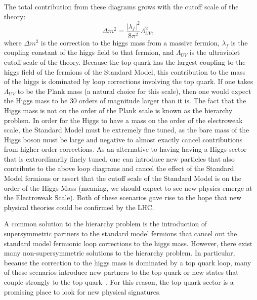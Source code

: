 The total contribution from these diagrams grows with the cutoff scale of the theory:
\begin{equation}
  \Delta m^{2} = \frac{|\lambda_f|^2}{8\pi^2}\Lambda_{UV}^2 ,
\end{equation}
where $\Delta m^{2}$ is the correction to the higgs mass from a massive fermion, $\lambda_f$ is the coupling constant of the higgs field to that fermion,
and $\Lambda_{UV}$ is the ultraviolet cutoff scale of the theory.
Because the top quark has the largest coupling to the higgs field of the fermions of the Standard Model,
this contribution to the mass of the higgs is dominated by loop corrections involving the top quark.
If one takes $\Lambda_{UV}$ to be the Plank mass (a natural choice for this scale),
then one would expect the Higgs mass to be 30 orders of magnitude larger than it is.
The fact that the Higgs mass is not on the order of the Plank scale is known as the hierarchy problem.
In order for the Higgs to have a mass on the order of the electroweak scale,
the Standard Model must be extremely fine tuned, as the bare mass of the Higgs boson must be large and negative to
almost exactly cancel contributions from higher order corrections.
As an alternative to having having a Higgs sector that is extrordinarily finely tuned,
one can introduce new particles that also contribute to the above loop diagrams
and cancel the effect of the Standard Model fermions
or assert that the cutoff scale of the Standard Model is on the order of the Higgs Mass
(meaning, we should expect to see new physics emerge at the Electroweak Scale).
Both of these scenarios gave rise to the hope that new physical theories could be confirmed by the LHC.

A common solution to the hierarchy problem is the introduction of supersymmetric partners to the standard model fermions
that cancel out the standard model fermionic loop corrections to the higgs mass.
However, there exist many non-supersymmetric solutions to the hierarchy problem.
In particular, because the correction to the higgs mass is dominated by a top quark loop,
many of these scenarios introduce new partners to the top quark or new states that couple
strongly to the top quark~\cite{Contino:2008cx,PhysRevD.78.074026,1126-6708-2008-04-087,1126-6708-2009-05-022}.
For this reason, the top quark sector is a promising place to look for new physical signatures.


